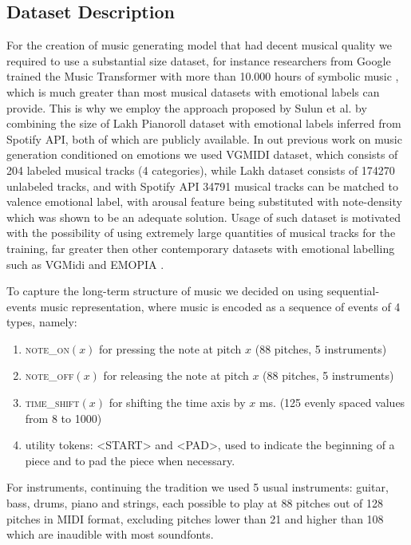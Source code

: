 \documentclass[14pt]{extreport}
\begin{document}
\subsection{Dataset Description}
For the creation of music generating model that had decent musical quality we required to use a substantial size dataset, for instance researchers from Google trained the Music Transformer with more than 10.000 hours of symbolic music \cite{huang}, which is much greater than most musical datasets with emotional labels can provide. This is why we employ the approach proposed by Sulun et al. \cite{sulun} by combining the size of Lakh Pianoroll dataset with emotional labels inferred from Spotify API, both of which are publicly available. In out previous work on music generation conditioned on emotions we used VGMIDI dataset, which consists of 204 labeled musical tracks (4 categories), while Lakh dataset consists of 174270 unlabeled tracks, and with Spotify API 34791 musical tracks can be matched to valence emotional label, with arousal feature being substituted with note-density \cite{sulun} which was shown to be an adequate solution. Usage of such dataset is motivated with the possibility of using extremely large quantities of musical tracks for the training, far greater then other contemporary datasets with emotional labelling such as VGMidi \cite{vgmidi} and EMOPIA \cite{emopia}.  

To capture the long-term structure of music we decided on using sequential-events music representation, where music is encoded as a sequence of events of 4 types, namely:
\begin{enumerate}
    \item \textsc{note\_on}$(x)$ for pressing the note at pitch $x$ (88 pitches, 5 instruments)
    \item \textsc{note\_off}$(x)$ for releasing the note at pitch $x$  (88 pitches, 5 instruments)
    \item \textsc{time\_shift}$(x)$ for shifting the time axis by $x$ ms. (125 evenly spaced values from 8 to 1000)
    \item utility tokens: \textsc{<START>} and \textsc{<PAD>}, used to indicate the beginning of a piece and to pad the piece when necessary.
\end{enumerate}
For instruments, continuing the tradition we used 5 usual instruments: guitar, bass, drums, piano and strings, each possible to play at 88 pitches out of 128 pitches in MIDI format, excluding pitches lower than 21 and higher than 108 which are inaudible with most soundfonts.
\end{document}
